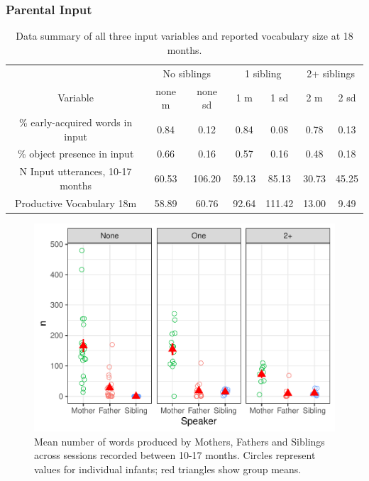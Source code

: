 \documentclass[
  english,
  man,floatsintext]{apa6}
\begin{document}
\hypertarget{parental-input}{%
\subsubsection{Parental Input}\label{parental-input}}

\begin{table}

\caption{\label{tab:table-data-summary}Data summary of all three input variables and reported vocabulary size at 18 months.}
\centering
\begin{tabular}[t]{ccccccc}
\toprule
\multicolumn{1}{c}{ } & \multicolumn{2}{c}{No siblings} & \multicolumn{2}{c}{1 sibling} & \multicolumn{2}{c}{2+ siblings} \\
\cmidrule(l{3pt}r{3pt}){2-3} \cmidrule(l{3pt}r{3pt}){4-5} \cmidrule(l{3pt}r{3pt}){6-7}
Variable & none m & none sd & 1 m & 1 sd & 2 m & 2 sd\\
\midrule
\% early-acquired words in input & 0.84 & 0.12 & 0.84 & 0.08 & 0.78 & 0.13\\
\% object presence in input & 0.66 & 0.16 & 0.57 & 0.16 & 0.48 & 0.18\\
N Input utterances, 10-17 months & 60.53 & 106.20 & 59.13 & 85.13 & 30.73 & 45.25\\
Productive Vocabulary 18m & 58.89 & 60.76 & 92.64 & 111.42 & 13.00 & 9.49\\
\bottomrule
\end{tabular}
\end{table}

\begin{figure}
\centering
\includegraphics{SiblingsStudyText_files/figure-latex/Figure-Speaker-count-1.pdf}
\caption{\label{fig:Figure-Speaker-count}Mean number of words produced by Mothers, Fathers and Siblings across sessions recorded between 10-17 months. Circles represent values for individual infants; red triangles show group means.}
\end{figure}
\end{document}
